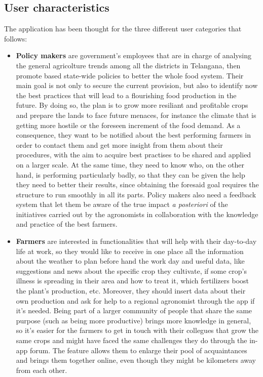 \documentclass[table, 12pt]{article}
\begin{document}
\subsection{User characteristics}
The application has been thought for the three different user categories that follows:
\begin{itemize}
    \item \textbf{Policy makers} are government's employees that are in charge of analysing the general agricolture trends among all the districts in Telangana, then promote based state-wide policies to better the whole food system. Their main goal is not only to secure the current provision, but also to identify now the best practices that will lead to a flourishing food production in the future. By doing so, the plan is to grow more resiliant and profitable crops and prepare the lands to face future menaces, for instance the climate that is getting more hostile or the foreseen increment of the food demand. As a consequence, they want to be notified about the best performing farmers in order to contact them and get more insight from them about their procedures, with the aim to acquire best practises to be shared and applied on a larger scale. At the same time, they need to know who, on the other hand, is performing particularly badly, so that they can be given the help they need to better their results, since obtaining the foresaid goal requires the structure to run smoothly in all its parts. 
    Policy makers also need a feedback system that let them be aware of the true impact \textit{a posteriori} of the initiatives carried out by the agronomists in collaboration with the knowledge and practice of the best farmers.
    \item \textbf{Farmers} are interested in functionalities that will help with their day-to-day life at work, so they would like to receive in one place all the information about the weather to plan before hand the work day and useful data, like suggestions and news about the specific crop they cultivate, if some crop's illness is spreading in their area and how to treat it, which fertilizers boost the plant's production, etc. Moreover, they should insert data about their own production and ask for help to a regional agronomist through the app if it's needed. Being part of a larger community of people that share the same purpose (such as being more productive) brings more knowledge in general, so it's easier for the farmers to get in touch with their collegues that grow the same crops and might have faced the same challenges they do through the in-app forum. The feature allows them to enlarge their pool of acquaintances and brings them together online, even though they might be kilometers away from each other.

\end{itemize}
\end{document}
